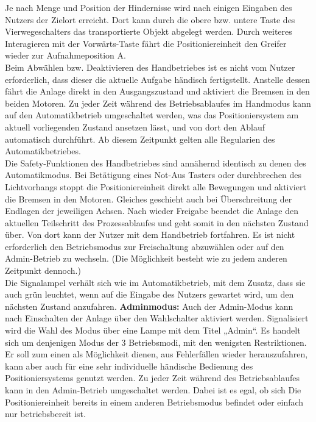 \documentclass[../Bachelorarbeit.tex]{subfiles}
\begin{document}
Je nach Menge und Position der Hindernisse wird nach einigen Eingaben des Nutzers der Zielort erreicht. Dort kann durch die obere bzw. untere Taste des Vierwegeschalters das transportierte Objekt abgelegt werden. Durch weiteres Interagieren mit der Vorwärts-Taste fährt die Positioniereinheit den Greifer wieder zur Aufnahmeposition A.\\
Beim Abwählen bzw. Deaktivieren des Handbetriebes ist es nicht vom Nutzer erforderlich, dass dieser die aktuelle Aufgabe händisch fertigstellt. Anstelle dessen fährt die Anlage direkt in den Ausgangszustand und aktiviert die Bremsen in den beiden Motoren. Zu jeder Zeit während des Betriebsablaufes im Handmodus kann auf den Automatikbetrieb umgeschaltet werden, was das Positioniersystem am aktuell vorliegenden Zustand ansetzen lässt, und von dort den Ablauf automatisch durchführt. Ab diesem Zeitpunkt gelten alle Regularien des Automatikbetriebes.\\
Die Safety-Funktionen des Handbetriebes sind annähernd identisch zu denen des Automatikmodus. Bei Betätigung eines Not-Aus Tasters oder durchbrechen des Lichtvorhangs stoppt die Positioniereinheit direkt alle Bewegungen und aktiviert die Bremsen in den Motoren. Gleiches geschieht auch bei Überschreitung der Endlagen der jeweiligen Achsen. Nach wieder Freigabe beendet die Anlage den aktuellen Teilschritt des Prozessablaufes und geht somit in den nächsten Zustand über. Von dort kann der Nutzer mit dem Handbetrieb fortfahren. Es ist nicht erforderlich den Betriebsmodus zur Freischaltung abzuwählen oder auf den Admin-Betrieb zu wechseln. (Die Möglichkeit besteht wie zu jedem anderen Zeitpunkt dennoch.)\\
Die Signalampel verhält sich wie im Automatikbetrieb, mit dem Zusatz, dass sie auch grün leuchtet, wenn auf die Eingabe des Nutzers gewartet wird, um den nächsten Zustand anzufahren.
\smallskip
\newline
\textbf{Adminmodus:} Auch der Admin-Modus kann nach Einschalten der Anlage über den Wahlschalter aktiviert werden. Signalisiert wird die Wahl des Modus über eine Lampe mit dem Titel „Admin“. Es handelt sich um denjenigen Modus der 3 Betriebsmodi, mit den wenigsten Restriktionen. Er soll zum einen als Möglichkeit dienen, aus Fehlerfällen wieder herauszufahren, kann aber auch für eine sehr individuelle händische Bedienung des Positioniersystems genutzt werden. Zu jeder Zeit während des Betriebsablaufes kann in den Admin-Betrieb umgeschaltet werden. Dabei ist es egal, ob sich Die Positioniereinheit bereits in einem anderen Betriebsmodus befindet oder einfach nur betriebsbereit ist.\\
\end{document}
